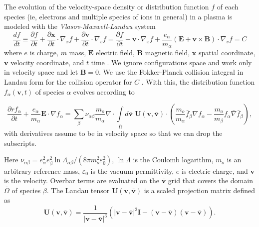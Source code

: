 \documentclass[12pt]{siamart}
\begin{document}
The evolution of the velocity-space density or
distribution function $f$ of each species (ie, electrons and multiple
species of ions in general) in a plasma is modeled with the {\it Vlasov-Maxwell-Landau} system
\begin{equation*}
\frac{df}{dt}\equiv
\frac{\partial f}{\partial t} + \frac{\partial\bm x}{\partial t}
\cdot \nabla_x f+ \frac{\partial\bm v}{\partial t} \cdot \nabla_v f
= \frac{\partial f}{\partial t} + {\bm v} \cdot \nabla_x f+
\frac{e_{\alpha}}{m_{\alpha}}\left( {\bm E} + {\bm v} \times {\bm B} \right) \cdot
\nabla_v f = C
\end{equation*}
where $e$ is charge, $m$ mass, ${\bm E} $ electric field, ${\bm B}$
magnetic field, ${\bm x}$ spatial coordinate, ${\bm v}$ velocity
coordinate, and $t$ time \cite{Vlasov1968}.
We ignore configurations space and work only in velocity space and let ${\bm B=0}$.
We use  the Fokker-Planck collision integral in Landau form for the collision operator for $C$ \cite{landau1936kinetic}.
With this, the distribution function $f_{\alpha}(\bm{v},t)$ of species $\alpha$ evolves according to

\begin{equation*}
\label{eq:landau1}
\frac{\partial r f_{\alpha}}{\partial t} + \frac{e_{\alpha}}{m_{\alpha}} {\bm E} \cdot \nabla f_{\alpha} = 
\sum_{\beta}\nu_{\alpha\beta}\frac{m_o}{m_{\alpha}}\nabla \cdot\int \limits_{\bar\Omega} d\bm{\bar{v}}\;\mathbf{U}(\bm{v},\bm{\bar{v}})\cdot\left(\frac{m_o}{m_{\alpha}}\bar{f}_{\beta}\nabla f_{\alpha} - \frac{m_o}{m_{\beta}}f_{\alpha} \bar \nabla \bar{f}_{\beta}\right),
\end{equation*}
with derivatives assume to be in velocity space so that we can drop the subscripts.

Here
$\nu_{\alpha\beta}=e_{\alpha}^2e_{\beta}^2\ln\Lambda_{\alpha\beta}/(8\pi m_o^2\varepsilon_0^2)$, $\ln\Lambda$ is the Coulomb logarithm, $m_o$
is an arbitrary reference mass, $\varepsilon_0$ is the vacuum
permittivity, $e$ is electric charge, and $\bm{v}$ is the velocity. Overbar terms are evaluated on the $\bm{\bar{v}}$ grid that covers the domain $\bar\Omega$ of species $\beta$.  The
Landau tensor $\mathbf{U}(\bm{v},\bm{\bar{v}})$ is a scaled projection
matrix defined as
\begin{equation*}
\label{eq:landau_tensor}
\mathbf{U}(\bm{v},\bm{\bar{v}})=\frac{1}{\lvert\bm{v}-\bm{\bar{v}}\rvert^3}\left(\lvert\bm{v}-\bm{\bar{v}}\rvert^2\mathbf{I}-(\bm{v}-\bm{\bar{v}})(\bm{v}-\bm{\bar{v}})\right).
\end{equation*}
\end{document}

